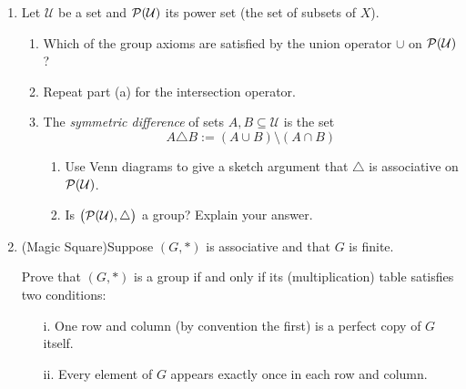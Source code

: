\begin{exercises}
\begin{enumerate}
	
	  \item Let $\mathcal U$ be a set and $\mathcal{P}(\mathcal U)$ its power set (the set of subsets of $X$).
	  \begin{enumerate}
	    \item Which of the group axioms are satisfied by the union operator $\cup$ on $\mathcal{P}(\mathcal U)$?
	    
	    \item Repeat part (a) for the intersection operator.
	    
	    \item The \emph{symmetric difference} of sets $A,B\subseteq \mathcal U$ is the set
	    \[
	    	A\triangle B:=(A\cup B)\setminus(A\cap B)
	    \]
	    \begin{enumerate}
	      \item Use Venn diagrams to give a sketch argument that $\triangle$ is associative on $\mathcal{P}(\mathcal U)$.
	      
	      \item Is $\bigl(\mathcal{P}(\mathcal U),\triangle\bigr)$ a group? Explain your answer.
	  	\end{enumerate}
	  \end{enumerate}
	  
	  
	  \item\label{exs:magicsquare} (Magic Square)\quad Suppose $(G,*)$ is associative and that $G$ is finite.\par
	  Prove that $(G,*)$ is a group if and only if its (multiplication) table satisfies two conditions:
			\begin{itemize}
			  \item[i.] One row and column (by convention the first) is a perfect copy of $G$ itself.
	  		\item[ii.] Every element of $G$ appears exactly once in each row and column.
			\end{itemize}



  
	  
	 

\end{enumerate}
\end{exercises}
